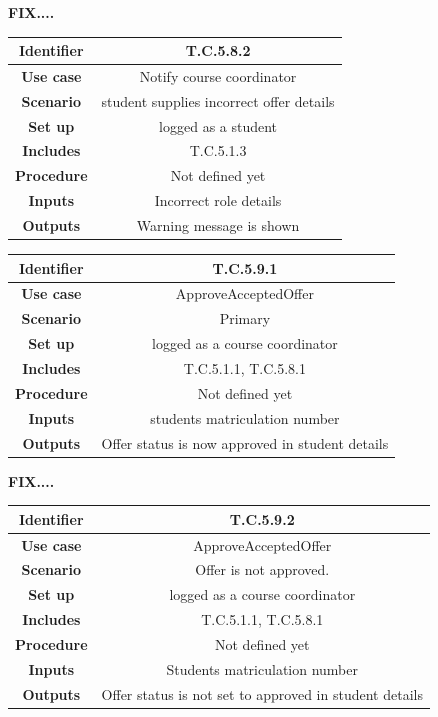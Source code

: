 \documentclass{l3deliverable}
\begin{document}
\textbf{FIX....}
\begin{tabular}{|c|c|}
\hline \textbf{Identifier} & T.C.5.8.2\\
\hline \textbf{Use case} & Notify course coordinator\\
\hline \textbf{Scenario} & student supplies incorrect offer details\\
\hline \textbf{Set up} & logged as a student\\
\hline \textbf{Includes} & T.C.5.1.3\\
\hline \textbf{Procedure} & Not defined yet\\
\hline \textbf{Inputs} & Incorrect role details \\
\hline \textbf{Outputs} & Warning message is shown\\
\hline
\end{tabular}

\begin{tabular}{|c|c|}
\hline \textbf{Identifier} & T.C.5.9.1\\
\hline \textbf{Use case} & ApproveAcceptedOffer\\
\hline \textbf{Scenario} & Primary\\
\hline \textbf{Set up} & logged as a course coordinator\\
\hline \textbf{Includes} & T.C.5.1.1, T.C.5.8.1\\
\hline \textbf{Procedure} & Not defined yet\\
\hline \textbf{Inputs} & students matriculation number\\
\hline \textbf{Outputs} & Offer status is now approved in student details\\
\hline
\end{tabular}

\textbf{FIX....}
\begin{tabular}{|c|c|}
\hline \textbf{Identifier} & T.C.5.9.2\\
\hline \textbf{Use case} & ApproveAcceptedOffer\\
\hline \textbf{Scenario} & Offer is not approved.\\
\hline \textbf{Set up} & logged as a course coordinator\\
\hline \textbf{Includes} & T.C.5.1.1, T.C.5.8.1\\
\hline \textbf{Procedure} & Not defined yet\\
\hline \textbf{Inputs} & Students matriculation number\\
\hline \textbf{Outputs} & Offer status is not set to approved in student details\\
\hline
\end{tabular}
\end{document}
